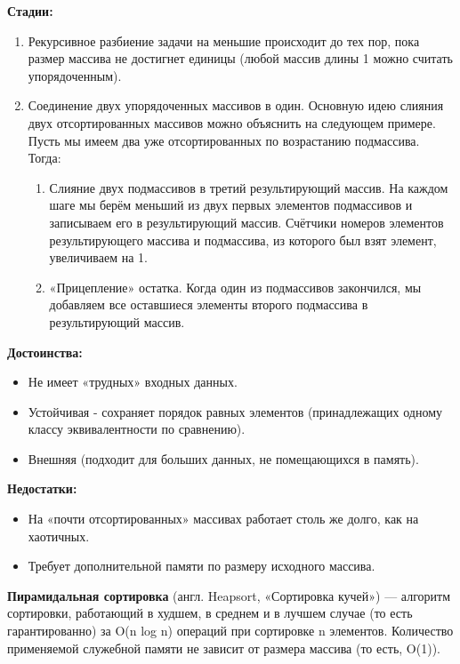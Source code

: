 \documentclass[12pt, a4paper]{article}
\begin{document}
\textbf{Стадии: }

\begin{enumerate}
    \item Рекурсивное разбиение задачи на меньшие происходит до тех пор, пока размер массива не достигнет единицы (любой массив длины 1 можно считать упорядоченным).
    \item Соединение двух упорядоченных массивов в один.
    Основную идею слияния двух отсортированных массивов можно объяснить на следующем примере. Пусть мы имеем два уже отсортированных по возрастанию подмассива. Тогда:
    \begin{enumerate}
        \item Слияние двух подмассивов в третий результирующий массив.
    На каждом шаге мы берём меньший из двух первых элементов подмассивов и записываем его в результирующий массив. Счётчики номеров элементов результирующего массива и подмассива, из которого был взят элемент, увеличиваем на 1.
        \item «Прицепление» остатка. Когда один из подмассивов закончился, мы добавляем все оставшиеся элементы второго подмассива в результирующий массив.
    \end{enumerate}
\end{enumerate}

\textbf{Достоинства: }

\begin{itemize}
    \item Не имеет «трудных» входных данных.
    \item Устойчивая - сохраняет порядок равных элементов (принадлежащих одному классу эквивалентности по сравнению).
    \item Внешняя (подходит для больших данных, не помещающихся в память).
\end{itemize}

\textbf{Недостатки: }

\begin{itemize}
    \item На «почти отсортированных» массивах работает столь же долго, как на хаотичных.
    \item Требует дополнительной памяти по размеру исходного массива.
\end{itemize}

\textbf{Пирамидальная сортировка} (англ. Heapsort, «Сортировка кучей») — алгоритм сортировки, работающий в худшем, в среднем и в лучшем случае (то есть гарантированно) за O(n log n) операций при сортировке n элементов. Количество применяемой служебной памяти не зависит от размера массива (то есть, O(1)).\\
\end{document}
